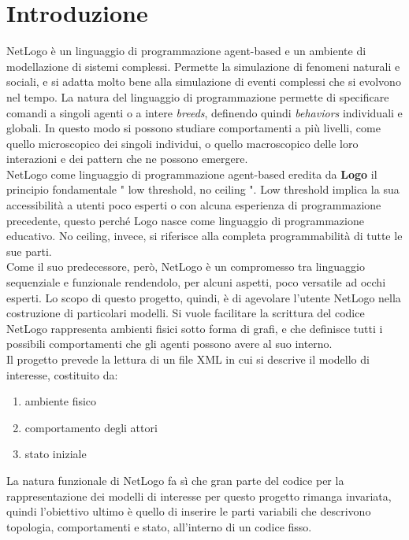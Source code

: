 \chapter{Introduzione}
NetLogo è un linguaggio di programmazione agent-based e un ambiente di modellazione di sistemi complessi. Permette la simulazione di fenomeni naturali e sociali, e si adatta molto bene alla simulazione di eventi complessi che si evolvono nel tempo. La natura del linguaggio di programmazione permette di specificare comandi a singoli agenti o a intere \textit{breeds}, definendo quindi \textit{behaviors} individuali e globali. In questo modo si possono studiare comportamenti a più livelli, come quello microscopico dei singoli individui, o quello macroscopico delle loro interazioni e dei pattern che ne possono emergere.\\
NetLogo come linguaggio di programmazione agent-based eredita da \textbf{Logo} il principio fondamentale " low threshold, no ceiling ". Low threshold implica la sua accessibilità a utenti poco esperti o con alcuna esperienza di programmazione precedente, questo perché Logo nasce come linguaggio di programmazione educativo. No ceiling, invece, si riferisce alla completa programmabilità di tutte le sue parti.\\
Come il suo predecessore, però, NetLogo è un compromesso tra linguaggio sequenziale e funzionale rendendolo, per alcuni aspetti, poco versatile ad occhi esperti. Lo scopo di questo progetto, quindi, è di agevolare l'utente NetLogo nella costruzione di particolari modelli. Si vuole facilitare la scrittura del codice NetLogo rappresenta ambienti fisici sotto forma di grafi, e che definisce tutti i possibili comportamenti che gli agenti possono avere al suo interno.\\
Il progetto prevede la lettura di un file XML in cui si descrive il modello di interesse, costituito da:
\begin{enumerate}
\item ambiente fisico
\item comportamento degli attori
\item stato iniziale 
\end{enumerate}
La natura funzionale di NetLogo fa sì che gran parte del codice per la rappresentazione dei modelli di interesse per questo progetto rimanga invariata, quindi l'obiettivo ultimo è quello di inserire le parti variabili che descrivono topologia, comportamenti e stato, all'interno di un codice fisso.
 